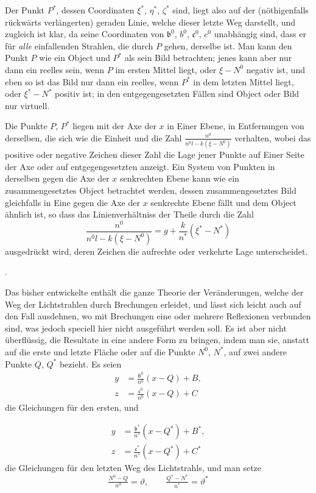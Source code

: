 \documentclass[11pt,a4paper]{article}
\begin{document}
\newpage
\noindent
Der Punkt $P^*$, dessen Coordinaten $\xi^*$, $\eta^*$, $\zeta^*$ sind, liegt also auf der (nöthigenfalls rückwärts verlängerten) geraden Linie, welche dieser letzte Weg darstellt, und zugleich ist klar, da seine Coordinaten von $\mathfrak{b}^0$, $b^0$, $\mathfrak{c}^0$, $c^0$ unabhängig sind, dass er für \textit{alle} einfallenden Strahlen, die durch $P$ gehen, derselbe ist. Man kann den Punkt $P$ wie ein Object und $P^*$ als sein Bild betrachten; jenes kann aber nur dann ein reelles sein, wenn $P$ im ersten Mittel liegt, oder $\xi - N^0$ negativ ist, und eben so ist das Bild nur dann ein reelles, wenn $P^*$ in dem letzten Mittel liegt, oder $\xi^* - N^*$ positiv ist; in den entgegengesetzten Fällen sind Object oder Bild nur virtuell.

Die Punkte $P$, $P^*$ liegen mit der Axe der $x$ in Einer Ebene, in Entfernungen von derselben, die sich wie die Einheit und die Zahl $\frac{n^0}{n^0 l - k(\xi - N^0)}$ verhalten, wobei das positive oder negative Zeichen dieser Zahl die Lage jener Punkte auf Einer Seite der Axe oder auf entgegengesetzten anzeigt. Ein System von Punkten in derselben gegen die Axe der $x$ senkrechten Ebene kann wie ein zusammengesetztes Object betrachtet werden, dessen zusammengesetztes Bild gleichfalls in Eine gegen die Axe der $x$ senkrechte Ebene fällt und dem Object ähnlich ist, so dass das Linienverhältniss der Theile durch die Zahl
\[
\frac{n^0}{n^0 l - k(\xi - N^0)} = g + \frac{k}{n^*}(\xi^* - N^*)
\]
ausgedrückt wird, deren Zeichen die aufrechte oder verkehrte Lage unterscheidet.

\bigskip{}.

\smallskip
Das bisher entwickelte enthält die ganze Theorie der Veränderungen, welche der Weg der Lichtstrahlen durch Brechungen erleidet, und lässt sich leicht auch auf den Fall ausdehnen, wo mit Brechungen eine oder mehrere Reflexionen verbunden sind, was jedoch speciell hier nicht ausgeführt werden soll. Es ist aber nicht überflüssig, die Resultate in eine andere Form zu bringen, indem man sie, anstatt auf die erste und letzte Fläche oder auf die Punkte $N^0$, $N^*$, auf zwei andere Punkte $Q$, $Q^*$ bezieht. Es seien
\begin{align*}
y &= \tfrac{\mathfrak{b}^0}{n^0}(x - Q) + B, \\
z &= \tfrac{\mathfrak{c}^0}{n^0}(x - Q) + C
\end{align*}
die Gleichungen für den ersten, und

\newpage
\noindent
\begin{align*}
y &= \tfrac{\mathfrak{b}^*}{n^*}(x - Q^*) + B^*, \\
z &= \tfrac{\mathfrak{c}^*}{n^*}(x - Q^*) + C^*
\end{align*}
die Gleichungen für den letzten Weg des Lichtstrahls, und man setze
\[
\tfrac{N^0 - Q}{n^0} = \vartheta, \qquad \tfrac{Q^* - N^*}{n^*} = \vartheta^*
\]
\end{document}
